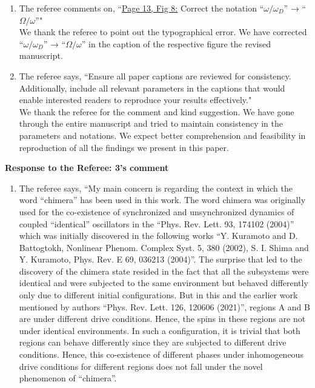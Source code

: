 \documentclass[aps,prb,reprint,showpacs,floatfix,superscriptaddress, onecolumn, nofootinbib, 10pt]{revtex4-2}
\newcommand{\response}[1]{{\color{black}#1}} %
\newcommand{\comment}[1]{{\color{blue}#1}} %
\begin{document}
\begin{enumerate}
\begin{enumerate}
		\item The referee comments on, \comment{``\underline{Page 13, Fig 8:} Correct the notation “$\omega/\omega_D$” → “$\Omega/\omega$”"}\\
		
		\response{We thank the referee to point out the typographical error. We have corrected “$\omega/\omega_D$” → “$\Omega/\omega$” in the caption of the respective figure the revised manuscript.}\\
		\item The referee says, \comment{``Ensure all paper captions are reviewed for consistency. Additionally, include all relevant
			parameters in the captions that would enable interested readers to reproduce your
			results effectively."}\\
		
		\response{We thank the referee for the comment and kind suggestion. We have gone through the entire manuscript and tried to maintain consistency in the parameters and notations. We expect  better comprehension and feasibility in reproduction of all the findings we present in this paper.}
	\end{enumerate}

	\newpage
	\noindent \textbf{Response to the Referee: 3's comment}
	\begin{enumerate}
		\item The referee says, \comment{``My main concern is regarding the context in which the word “chimera” has been used
			in this work. The word chimera was originally used for the co-existence of synchronized and unsynchronized dynamics of coupled “identical” oscillators in the “Phys. Rev. Lett. 93, 174102 (2004)” which was initially discovered in the following
			works “Y. Kuramoto and D. Battogtokh, Nonlinear Phenom. Complex Syst. 5, 380 (2002), S. I. Shima and Y. Kuramoto, Phys. Rev. E 69, 036213 (2004)”. The surprise that led to the discovery of the chimera state resided in the fact that all the
			subsystems were identical and were subjected to the same environment but behaved differently only due to different initial configurations. But in this and the earlier work mentioned by authors “Phys. Rev. Lett. 126, 120606 (2021)”, regions A and B are under different drive conditions. Hence, the spins in these regions are not under identical environments. In such a configuration, it is trivial that both regions can behave differently since they are subjected to different drive conditions. Hence, this co-existence of different phases under inhomogeneous drive conditions for different
			regions does not fall under the novel phenomenon of “chimera”.\\
			
}
\end{enumerate}
\end{enumerate}
\end{document}
